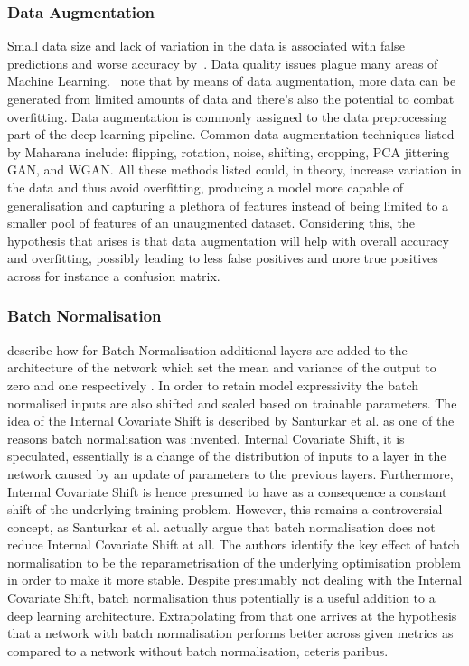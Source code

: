 \subsubsection{Data Augmentation}\label{augmentationtheory}
Small data size and lack of variation in the data is associated with false predictions and worse accuracy by~\citeauthor{maharana2022review}. Data quality issues plague many areas of Machine Learning.~\citeauthor{maharana2022review} note that by means of data augmentation, more data can be generated from limited amounts of data and there's also the potential to combat overfitting. Data augmentation is commonly assigned to the data preprocessing part of the deep learning pipeline. Common data augmentation techniques listed by Maharana include: flipping, rotation, noise, shifting, cropping, PCA jittering GAN, and WGAN\@. All these methods listed could, in theory, increase variation in the data and thus avoid overfitting, producing a model more capable of generalisation and capturing a plethora of features instead of being limited to a smaller pool of features of an unaugmented dataset. Considering this, the hypothesis that arises is that data augmentation will help with overall accuracy and overfitting, possibly leading to less false positives and more true positives across for instance a confusion matrix.


\subsubsection{Batch Normalisation}\label{batchnormtheory}
\citeauthor{santurkar2018does} describe how for Batch Normalisation additional layers are added to the architecture of the network which set the mean and variance of the output to zero and one respectively \citep{santurkar2018does}. In order to retain model expressivity the batch normalised inputs are also shifted and scaled based on trainable parameters. The idea of the Internal Covariate Shift is described by Santurkar et al\@. as one of the reasons batch normalisation was invented. Internal Covariate Shift, it is speculated, essentially is a change of the distribution of inputs to a layer in the network caused by an update of parameters to the previous layers. Furthermore, Internal Covariate Shift is hence presumed to have as a consequence a constant shift of the underlying training problem. However, this remains a controversial concept, as Santurkar et al\@. actually argue that batch normalisation does not reduce Internal Covariate Shift at all. The authors identify the key effect of batch normalisation to be the reparametrisation of the underlying optimisation problem in order to make it more stable. Despite presumably not dealing with the Internal Covariate Shift, batch normalisation thus potentially is a useful addition to a deep learning architecture. Extrapolating from that one arrives at the hypothesis that a network with batch normalisation performs better across given metrics as compared to a network without batch normalisation, ceteris paribus.


